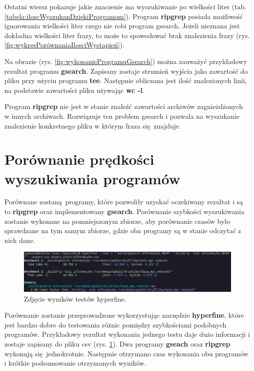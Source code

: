 Ostatni wiersz pokazuje jakie znaczenie ma wyszukiwanie po wielkości liter 
(tab. \ref{tabela:iloscWyszukanDziekiProgramom}). Program \textbf{ripgrep} posiada 
możliwość ignorowania wielkości liter czego nie robi program gsearch. Jeżeli
nieznana jest dokładna wielkości liter frazy, to może to spowodować brak 
znalezienia frazy (rys. \ref{fig:wykresPorównaniaIlosciWystapień}). 

Na obrazie (rys. \ref{fig:wykonanieProgramuGsearch}) można zauważyć przykładowy
rezultat programu \textbf{gsearch}. Zapisany zostaje strumień wyjścia jako zawartość do pliku
przy użyciu programu \textbf{tee}. Następnie obliczana jest ilość znalezionych linii,
na podstawie zawartości pliku używając \textbf{wc -l}.

Program \textbf{ripgrep} nie jest w stanie znaleźć zawartości archiwów zagnieżdżonych \\ w
innych archiwach. Rozwiązuje ten problem gsearch i pozwala na wyszukanie 
znalezienie konkretnego pliku w którym fraza się znajduje.

\section{Porównanie prędkości wyszukiwania programów}

Porównane zostaną programy, które pozwoliły uzyskać oczekiwany rezultat i są to
\textbf{ripgrep} oraz implementowany \textbf{gsearch}. 
Porównanie szybkości wyszukiwania zostanie wykonane na pomniejszonym zbiorze,
aby porównanie czasów było sprawdzane na tym samym zbiorze, gdzie oba programy
są w stanie odczytać z nich dane.

\begin{figure}[htbp]
    \centering
    \includegraphics[width=\textwidth]{./images/example-hyperfine-run.png}
    \caption{Zdjęcie wyników testów hyperfine.}
    \label{fig:hyperfineExample}
\end{figure}

Porównanie zostanie przeprowadzone wykorzystując narzędzie \textbf{hyperfine}, które
jest bardzo dobre do testowania różnic pomiędzy szybkościami podobnych programów.
Przykładowy rezultat wykonania jednego testu daje dużo informacji i zostaje
zapisany do pliku csv (rys. \ref{fig:hyperfineExample}). Dwa programy \textbf{gseach} 
oraz \textbf{ripgrep} wykonują się jednokrotnie. Następnie otrzymano czas wykonania obu
programów i krótkie podsumowanie otrzymanych wyników. 

